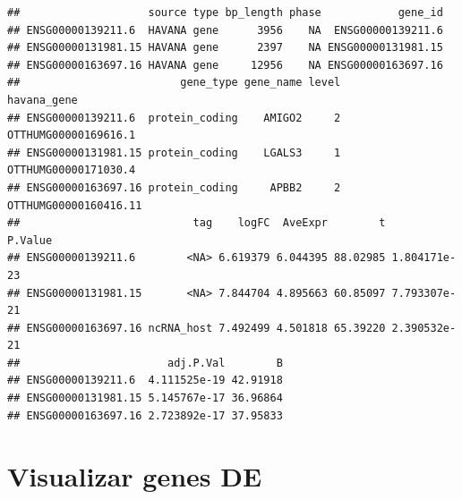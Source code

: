 \documentclass[
]{article}
\newenvironment{Shaded}{\begin{snugshade}}{\end{snugshade}}
\newcommand{\DocumentationTok}[1]{\textcolor[rgb]{0.56,0.35,0.01}{\textbf{\textit{#1}}}}
\newcommand{\FunctionTok}[1]{\textcolor[rgb]{0.13,0.29,0.53}{\textbf{#1}}}
\newcommand{\NormalTok}[1]{#1}
\newcommand{\SpecialCharTok}[1]{\textcolor[rgb]{0.81,0.36,0.00}{\textbf{#1}}}
\newcommand{\StringTok}[1]{\textcolor[rgb]{0.31,0.60,0.02}{#1}}
\begin{document}
\begin{Shaded}
\end{Shaded}

\begin{verbatim}
##                    source type bp_length phase            gene_id
## ENSG00000139211.6  HAVANA gene      3956    NA  ENSG00000139211.6
## ENSG00000131981.15 HAVANA gene      2397    NA ENSG00000131981.15
## ENSG00000163697.16 HAVANA gene     12956    NA ENSG00000163697.16
##                         gene_type gene_name level           havana_gene
## ENSG00000139211.6  protein_coding    AMIGO2     2  OTTHUMG00000169616.1
## ENSG00000131981.15 protein_coding    LGALS3     1  OTTHUMG00000171030.4
## ENSG00000163697.16 protein_coding     APBB2     2 OTTHUMG00000160416.11
##                           tag    logFC  AveExpr        t      P.Value
## ENSG00000139211.6        <NA> 6.619379 6.044395 88.02985 1.804171e-23
## ENSG00000131981.15       <NA> 7.844704 4.895663 60.85097 7.793307e-21
## ENSG00000163697.16 ncRNA_host 7.492499 4.501818 65.39220 2.390532e-21
##                       adj.P.Val        B
## ENSG00000139211.6  4.111525e-19 42.91918
## ENSG00000131981.15 5.145767e-17 36.96864
## ENSG00000163697.16 2.723892e-17 37.95833
\end{verbatim}

\section{Visualizar genes DE}\label{visualizar-genes-de}
\end{document}

